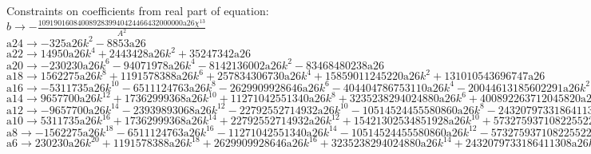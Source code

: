 \documentclass[12pt,a4paper,draft]{article}
\begin{document}
Constraints on coefficients from real part of equation:
\\$b\to -\frac{1091901608400892839940424466432000000 \text{a26} \chi ^{13}}{A^2}$\\
$\text{a24}\to -325 \text{a26} k^2-8853 \text{a26}$\\
$\text{a22}\to 14950 \text{a26} k^4+2443428 \text{a26} k^2+35247342 \text{a26}$\\
$\text{a20}\to -230230 \text{a26} k^6-94071978 \text{a26} k^4-8142136002 \text{a26} k^2-83468480238 \text{a26}$\\
$\text{a18}\to 1562275 \text{a26} k^8+1191578388 \text{a26} k^6+257834306730 \text{a26} k^4+15859011245220 \text{a26} k^2+131010543696747 \text{a26}$\\
$\text{a16}\to -5311735 \text{a26} k^{10}-6511124763 \text{a26} k^8-2629909928646 \text{a26} k^6-404404786753110 \text{a26} k^4-20044613185602291 \text{a26} k^2-143746327179098943 \text{a26}$\\
$\text{a14}\to 9657700 \text{a26} k^{12}+17362999368 \text{a26} k^{10}+11271042551340 \text{a26} k^8+3235238294024880 \text{a26} k^6+400892263712045820 \text{a26} k^4+17249559261491873160 \text{a26} k^2+113281611928965609972 \text{a26}$\\
$\text{a12}\to -9657700 \text{a26} k^{14}-23939893068 \text{a26} k^{12}-22792552714932 \text{a26} k^{10}-10514524455580860 \text{a26} k^8-2432079733186411308 \text{a26} k^6-261618315465960076260 \text{a26} k^4-10308626685535870507452 \text{a26} k^2-64833290426791693735188 \text{a26}$\\
$\text{a10}\to 5311735 \text{a26} k^{16}+17362999368 \text{a26} k^{14}+22792552714932 \text{a26} k^{12}+15421302534851928 \text{a26} k^{10}+5732759371082255226 \text{a26} k^8+1151120588050224335544 \text{a26} k^6+113394893540894575581972 \text{a26} k^4+4278997168168251786522408 \text{a26} k^2+26909157364413628487178567 \text{a26}$\\
$\text{a8}\to -1562275 \text{a26} k^{18}-6511124763 \text{a26} k^{16}-11271042551340 \text{a26} k^{14}-10514524455580860 \text{a26} k^{12}-5732759371082255226 \text{a26} k^{10}-1850015230795003396410 \text{a26} k^8-340184680622683726745916 \text{a26} k^6-32092478761261888398918060 \text{a26} k^4-1210912081398613281923035515 \text{a26} k^2-7988017750729673281619483203 \text{a26}$\\
$\text{a6}\to 230230 \text{a26} k^{20}+1191578388 \text{a26} k^{18}+2629909928646 \text{a26} k^{16}+3235238294024880 \text{a26} k^{14}+2432079733186411308 \text{a26} k^{12}+1151120588050224335544 \text{a26} k^{10}+340184680622683726745916 \text{a26} k^8+59905960354355525011313712 \text{a26} k^6+5650923046526861982307499070 \text{a26} k^4+223664497020430851885345529684 \text{a26} k^2+1646018022725525727859018749246 \text{a26}$\\
\end{document}
